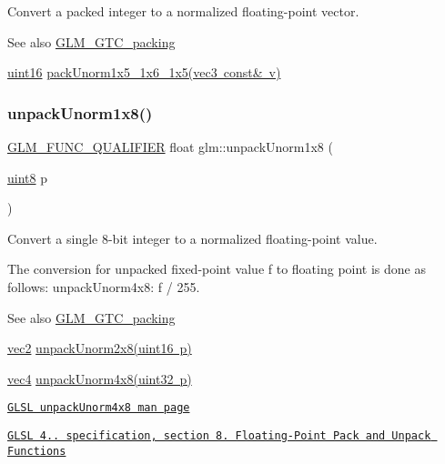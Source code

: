 Convert a packed integer to a normalized floating-\/point vector.

\begin{DoxySeeAlso}{See also}
\mbox{\hyperlink{group__gtc__packing}{G\+L\+M\+\_\+\+G\+T\+C\+\_\+packing}} 

\mbox{\hyperlink{group__gtc__type__precision_gad8c2939e1fdd8e5828b31d95c52255d5}{uint16}} \mbox{\hyperlink{group__gtc__packing_ga0fcb493167d540aca105d11df5c55503}{pack\+Unorm1x5\+\_\+1x6\+\_\+1x5(vec3 const\& v)}} 
\end{DoxySeeAlso}
\mbox{\label{group__gtc__packing_ga32f3f2642df2ea87449d59fb614a8305}} 
\subsubsection{\texorpdfstring{unpack\+Unorm1x8()}{unpackUnorm1x8()}}
{\footnotesize\ttfamily \mbox{\hyperlink{setup_8hpp_a33fdea6f91c5f834105f7415e2a64407}{G\+L\+M\+\_\+\+F\+U\+N\+C\+\_\+\+Q\+U\+A\+L\+I\+F\+I\+ER}} float glm\+::unpack\+Unorm1x8 (\begin{DoxyParamCaption}\item[{\mbox{\hyperlink{group__gtc__type__precision_ga1a7dcd8aac97cc8020817c94049deff2}{uint8}}}]{p }\end{DoxyParamCaption})}

Convert a single 8-\/bit integer to a normalized floating-\/point value.

The conversion for unpacked fixed-\/point value f to floating point is done as follows\+: unpack\+Unorm4x8\+: f / 255.

\begin{DoxySeeAlso}{See also}
\mbox{\hyperlink{group__gtc__packing}{G\+L\+M\+\_\+\+G\+T\+C\+\_\+packing}} 

\mbox{\hyperlink{group__core__types_gaa1618f51db67eaa145db101d8c8431d8}{vec2}} \mbox{\hyperlink{group__gtc__packing_ga96ce0c24339ee676e28a027fffd1edf6}{unpack\+Unorm2x8(uint16 p)}} 

\mbox{\hyperlink{group__core__types_ga5881b1b022d7fd1b7218f5916532dd02}{vec4}} \mbox{\hyperlink{group__core__func__packing_ga7f903259150b67e9466f5f8edffcd197}{unpack\+Unorm4x8(uint32 p)}} 

\href{http://www.opengl.org/sdk/docs/manglsl/xhtml/unpackUnorm4x8.xml}{\tt G\+L\+SL unpack\+Unorm4x8 man page} 

\href{http://www.opengl.org/registry/doc/GLSLangSpec.4.20.8.pdf}{\tt G\+L\+SL 4.. specification, section 8. Floating-\/\+Point Pack and Unpack Functions} 
\end{DoxySeeAlso}
\mbox{\label{group__gtc__packing_gaeeacc5275329100c50fe8fc0871eb423}} 
